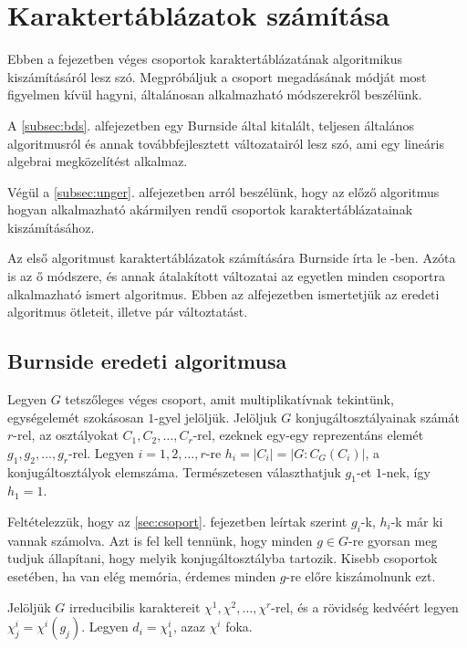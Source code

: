 \section{Karaktertáblázatok számítása}
\label{sec:karakter}
Ebben a fejezetben véges csoportok karaktertáblázatának algoritmikus kiszámításáról lesz szó.
Megpróbáljuk a csoport megadásának módját most figyelmen kívül hagyni, általánosan alkalmazható
módszerekről beszélünk.

A \ref{subsec:bds}. alfejezetben egy Burnside által kitalált, teljesen általános algoritmusról
és annak továbbfejlesztett változatairól lesz szó, ami egy lineáris algebrai megközelítést alkalmaz.


Végül a \ref{subsec:unger}. alfejezetben arról beszélünk, hogy az előző algoritmus hogyan alkalmazható
akármilyen rendű csoportok karaktertáblázatainak kiszámításához.

Az első algoritmust karaktertáblázatok számítására Burnside írta le \cite{Bur11}-ben. Azóta is az ő módszere, és annak átalakított változatai
az egyetlen minden csoportra alkalmazható ismert algoritmus.
Ebben az alfejezetben ismertetjük az eredeti algoritmus ötleteit, illetve pár változtatást.

\subsection{Burnside eredeti algoritmusa}
\label{subsec:bdseredeti}
Legyen $G$ tetszőleges véges csoport, amit multiplikatívnak tekintünk, egységelemét szokásosan $1$-gyel jelöljük.
Jelöljuk $G$ konjugáltosztályainak számát $r$-rel, az osztályokat $C_1, C_2, \dots, C_r$-rel, ezeknek egy-egy reprezentáns elemét $g_1, g_2, \dots, g_r$-rel.
Legyen $i=1, 2, \dots, r$-re $h_i=|C_i|=|G:C_G(C_i)|$, a konjugáltosztályok elemszáma.
Természetesen választhatjuk $g_1$-et $1$-nek, így $h_1=1$.

Feltételezzük, hogy az \ref{sec:csoport}. fejezetben leírtak szerint $g_i$-k, $h_i$-k már ki vannak számolva.
Azt is fel kell tennünk, hogy minden $g\in G$-re gyorsan meg tudjuk állapítani, hogy melyik konjugáltosztályba tartozik.
Kisebb csoportok esetében, ha van elég memória, érdemes minden $g$-re előre kiszámolnunk ezt.

Jelöljük $G$ irreducibilis karaktereit $\chi^1, \chi^2, \dots, \chi^r$-rel, és a rövidség kedvéért legyen $\chi^i_j=\chi^i(g_j)$.
Legyen $d_i=\chi^i_1$, azaz $\chi^i$ foka.

